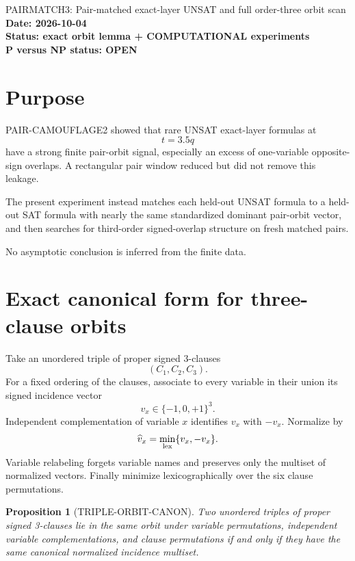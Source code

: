 \documentclass[11pt]{article}
\newtheorem{proposition}{Proposition}
\begin{document}
\begin{center}
{\Large PAIRMATCH3: Pair-matched exact-layer UNSAT and full order-three orbit scan}\\[4pt]
\textbf{Date: 2026-10-04}\\
\textbf{Status: exact orbit lemma + COMPUTATIONAL experiments}\\
\textbf{P versus NP status: OPEN}
\end{center}

\section{Purpose}

PAIR-CAMOUFLAGE2 showed that rare UNSAT exact-layer formulas at
\[
t=3.5q
\]
have a strong finite pair-orbit signal, especially an excess of one-variable
opposite-sign overlaps. A rectangular pair window reduced but did not remove
this leakage.

The present experiment instead matches each held-out UNSAT formula to a
held-out SAT formula with nearly the same standardized dominant pair-orbit
vector, and then searches for third-order signed-overlap structure on fresh
matched pairs.

No asymptotic conclusion is inferred from the finite data.

\section{Exact canonical form for three-clause orbits}

Take an unordered triple of proper signed 3-clauses
\[
(C_1,C_2,C_3).
\]
For a fixed ordering of the clauses, associate to every variable in their
union its signed incidence vector
\[
v_x\in\{-1,0,+1\}^3.
\]
Independent complementation of variable \(x\) identifies \(v_x\) with
\(-v_x\). Normalize by
\[
\widehat v_x=\min_{\rm lex}\{v_x,-v_x\}.
\]
Variable relabeling forgets variable names and preserves only the multiset of
normalized vectors. Finally minimize lexicographically over the six clause
permutations.

\begin{proposition}[TRIPLE-ORBIT-CANON]
Two unordered triples of proper signed 3-clauses lie in the same orbit under
variable permutations, independent variable complementations, and clause
permutations if and only if they have the same canonical normalized incidence
multiset.
\end{proposition}
\end{document}
